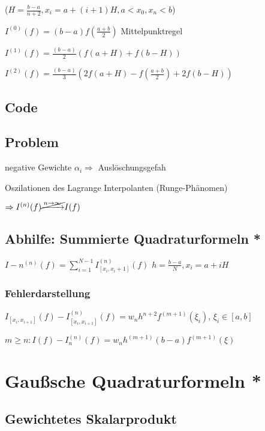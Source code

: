\documentclass[12pt,a4paper]{article} %
\newcommand*\tab[1][1cm]{\hspace*{#1}}
\begin{document}
	($H = \frac{b - a}{n + 2}, x_i = a + (i + 1)H, a < x_0, x_n < b$)
	
	$I^{(0)}(f) = (b - a)f(\frac{a + b}{2})$ \tab Mittelpunktregel
	
	$I^{(1)}(f) = \frac{(b - a)}{2}(f(a + H) + f(b - H))$
	
	$I^{(2)}(f) = \frac{(b-  a)}{3}(2f(a + H) - f(\frac{a + b}{2}) + 2f(b - H))$
	
	\subsection{Code}
	
	\subsection{Problem}
	
	negative Gewichte $\alpha_i \Rightarrow$ Auslöschungsgefah
	
	Oszilationen des Lagrange Interpolanten (Runge-Phänomen) 
	
	$\Rightarrow I^{(n)}(f)\cancel{\xrightarrow{n \rightarrow\infty}}I(f) $
	
	\subsection{Abhilfe: Summierte Quadraturformeln *}
	
	$I-n^{(n)}(f) = \sum\limits_{i = 1}^{N - 1}I_{[x_i, x_i + 1]}^{(n)}(f)$ \tab $h = \frac{b - a}{N}, x_i = a + iH$
	
	\subsubsection{Fehlerdarstellung}
	
	$I_{[x_i, x_{i + 1}]}(f) - I_{[x_i, x_{i + 1}]}^{(n)}(f) = w_nh^{n + 2}f^{(m + 1)}(\xi_i)$, \tab $\xi_i \in [a, b]$
	
	$m \ge n: I(f) - I_n^{(n)}(f) = w_nh^{(m + 1)}(b - a)f^{(m + 1)}(\xi)$
	
	\newpage
	
	\section{Gaußsche Quadraturformeln *}
	
	\subsection{Gewichtetes Skalarprodukt}
	
\end{document}
